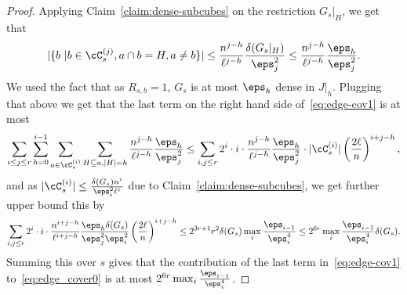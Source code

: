 \begin{proof}
Applying Claim~\ref{claim:dense-subcubes} on the 
restriction $G_s|_H$, we get that 
\[
|\{b~|b\in \cC^{(j)}_s, a\cap b = H, a\neq b\}|
\leq \frac{n^{j-h}}{\ell^{j-h}}\frac{\delta(G_s|_H)}{\eps_{j}^2}
\leq \frac{n^{j-h}}{\ell^{j-h}}\frac{\eps_h}{\eps_{j}^2}.
\]
We used the fact that as $R_{s,b} = 1$,  $G_s$ is at most $\eps_h$ dense in $J|_h$. Plugging that above we get that the last term 
on the right hand side of~\eqref{eq:edge-cov1} is 
at most
\[
\sum_{i\leq j \leq r} 
\sum\limits_{h=0}^{i-1}
\sum_{a \in \cC^{(i)}_s}
\sum_{H\subseteq a, |H| = h}
\frac{n^{j-h}}{\ell^{j-h}}\frac{\eps_h}{\eps_{j}^2}
\leq 
\sum_{i, j \leq r} 
2^i \cdot i\cdot \frac{n^{j-h}}{\ell^{j-h}}\frac{\eps_h}{\eps_{j}^2}
\cdot |\cC^{(i)}_s|\left(\frac{2\ell}{n}\right)^{i+j-h},
\]
and as $|\cC^{(i)}_s|\leq \frac{\delta(G_s)n^i}{\eps_i^2\ell^i}$ due to 
Claim~\ref{claim:dense-subcubes}, we get further upper
bound this by
\[
\sum_{i, j \leq r} 
2^i \cdot i\cdot \frac{n^{i+j-h}}{\ell^{i+j-h}}\frac{\eps_h\delta(G_s)}{\eps_{j}^2\eps_i^2}
\left(\frac{2\ell}{n}\right)^{i+j-h}
\leq
2^{3r+1} r^2\delta(G_s) \max_{i}\frac{\eps_{i-1}}{\eps_i^4}
\leq 2^{6r}\max_{i}\frac{\eps_{i-1}}{\eps_i^4}\delta(G_s).
\]
Summing this over $s$ gives that the contribution of the last term in~\eqref{eq:edge-cov1} to~\eqref{eq:edge_cover0} is at most
$2^{6r}\max_{i}\frac{\eps_{i-1}}{\eps_i^4}$.






\end{proof}
